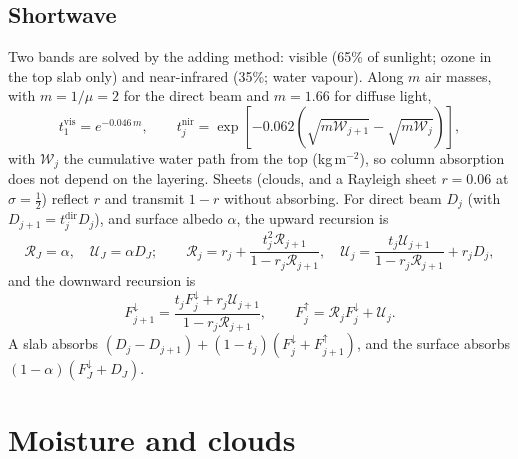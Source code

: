 \documentclass[11pt,a4paper]{article}
\begin{document}
\subsection{Shortwave}
Two bands are solved by the adding method: visible (65\% of sunlight; ozone in the
top slab only) and near-infrared (35\%; water vapour). Along $m$ air masses, with
$m = 1/\mu = 2$ for the direct beam and $m = 1.66$ for diffuse light,
\begin{equation}
t^{\mathrm{vis}}_{1} = e^{-0.046\,m}, \qquad
t^{\mathrm{nir}}_j = \exp\!\left[-0.062\left(\sqrt{m\mathcal{W}_{j+1}}
   - \sqrt{m\mathcal{W}_j}\right)\right],
\end{equation}
with $\mathcal{W}_j$ the cumulative water path from the top (kg\,m$^{-2}$), so
column absorption does not depend on the layering. Sheets (clouds, and a Rayleigh
sheet $r = 0.06$ at $\sigma = \tfrac12$) reflect $r$ and transmit $1-r$ without
absorbing. For direct beam $D_j$ (with $D_{j+1} = t^{\mathrm{dir}}_j D_j$), and
surface albedo $\alpha$, the upward recursion is
\begin{equation}
\mathcal{R}_{J} = \alpha, \quad \mathcal{U}_{J} = \alpha D_{J}; \qquad
\mathcal{R}_j = r_j + \frac{t_j^2\mathcal{R}_{j+1}}{1 - r_j\mathcal{R}_{j+1}}, \quad
\mathcal{U}_j = \frac{t_j\mathcal{U}_{j+1}}{1 - r_j\mathcal{R}_{j+1}} + r_j D_j,
\end{equation}
and the downward recursion is
\begin{equation}
F^\downarrow_{j+1} = \frac{t_j F^\downarrow_j + r_j\mathcal{U}_{j+1}}{1 - r_j\mathcal{R}_{j+1}},
\qquad F^\uparrow_j = \mathcal{R}_j F^\downarrow_j + \mathcal{U}_j .
\end{equation}
A slab absorbs $(D_j - D_{j+1}) + (1-t_j)(F^\downarrow_j + F^\uparrow_{j+1})$, and
the surface absorbs $(1-\alpha)(F^\downarrow_J + D_J)$.

\section{Moisture and clouds}
\end{document}
